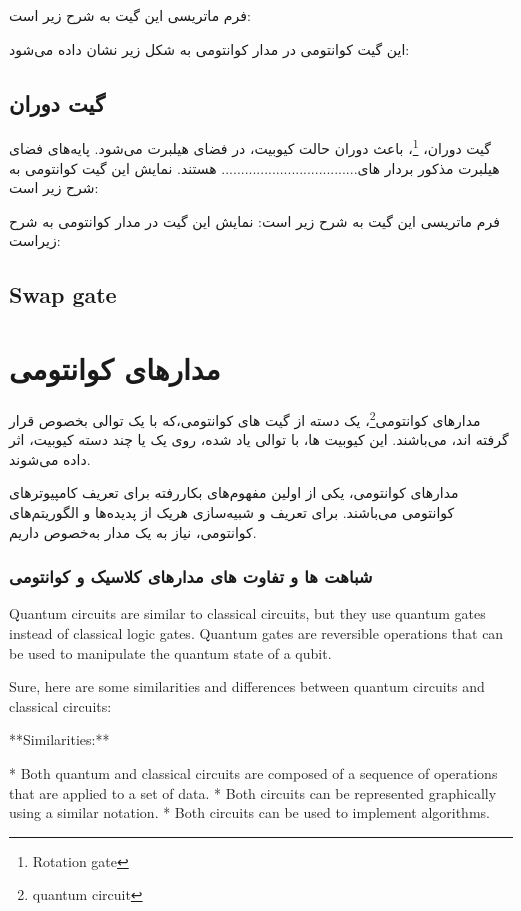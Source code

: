 \documentclass{book}
\begin{document}
فرم ماتریسی این گیت به شرح زیر است:

این گیت کوانتومی در مدار کوانتومی به شکل زیر نشان داده می‌شود:

\subsection*{گیت دوران}
گیت دوران، \footnote{Rotation gate}، باعث دوران حالت کیوبیت، در فضای هیلبرت ‌می‌شود. پایه‌های فضای هیلبرت مذکور بردار های................................... هستند. نمایش این گیت کوانتومی به شرح زیر است:

فرم ماتریسی این گیت به شرح زیر است:
نمایش این گیت در مدار کوانتومی به شرح زیراست:


\subsection{Swap gate}




\section{مدار‌های کوانتومی}

مدار‌های ‌کوانتومی\footnote{quantum circuit}، یک دسته از گیت ها‌ی کوانتومی،که با یک توالی بخصوص قرار گرفته اند، ‌می‌باشند. این کیوبیت ها، با توالی یاد شده، روی یک یا چند دسته کیوبیت، اثر داده ‌می‌شوند. 

مدار‌های کوانتومی، یکی از اولین مفهوم‌های بکار‌رفته برای تعریف کامپیوتر‌های کوانتومی‌ می‌باشند. برای تعریف و شبیه‌سازی هریک از پدیده‌ها و الگوریتم‌های کوانتومی، نیاز به یک مدار به‌خصوص داریم.

\subsubsection{شباهت ها و تفاوت های مدارهای کلاسیک و کوانتومی}
Quantum circuits are similar to classical circuits, but they use quantum gates instead of classical logic gates. Quantum gates are reversible operations that can be used to manipulate the quantum state of a qubit.

Sure, here are some similarities and differences between quantum circuits and classical circuits:

**Similarities:**

* Both quantum and classical circuits are composed of a sequence of operations that are applied to a set of data.
* Both circuits can be represented graphically using a similar notation.
* Both circuits can be used to implement algorithms.
\end{document}
